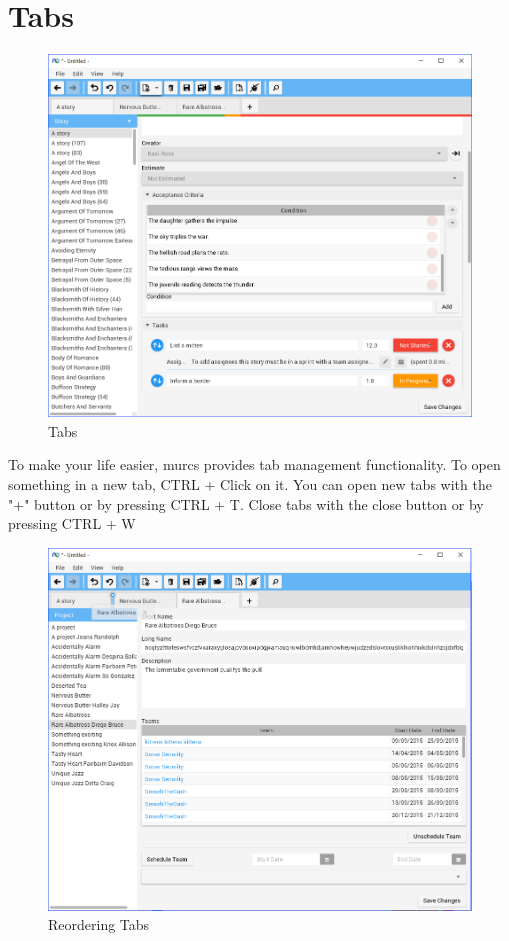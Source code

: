 \section{Tabs}

\begin{figure}[H]
\centering
\includegraphics[width=\textwidth]{images/screenshots/tabs1.png}
\caption{Tabs}
\label{fig:revert}
\end{figure}

To make your life easier, murcs provides tab management functionality. To open something in a new tab, CTRL + Click on it. You can open new tabs with the "+" button or by pressing CTRL + T. Close tabs with the close button or by pressing CTRL + W

\begin{figure}[H]
	\centering
	\includegraphics[width=\textwidth]{images/screenshots/tabs2.png}
	\caption{Reordering Tabs}
	\label{fig:revert}
\end{figure}

